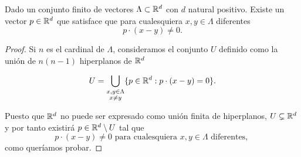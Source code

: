 \begin{lema}\label{lema:previo_propio_2_al_teorema_2_5}
    Dado un conjunto finito de vectores $\Lambda \subset \mathbb{R}^d$ con 
    $d$ natural positivo. 
    Existe un vector $p \in \mathbb{R}^d$ que satisface que 
    para cualesquiera $x,y \in \Lambda$ diferentes 
    \begin{equation}
        p \cdot(x-y) \neq 0.
    \end{equation}
\end{lema}
\begin{proof}
    Si $n$ es el cardinal de $\Lambda$,
    consideramos el conjunto $U$ definido como la unión de 
    $n (n-1)$ hiperplanos de $\mathbb{R}^d$

    \begin{equation}
        U = \bigcup_{ 
            \substack{
                x,y \in \Lambda \\
                x \neq y
            }
        }
        \{ 
            p \in \mathbb{R}^d: p \cdot (x-y) = 0
        \}.
    \end{equation}

    Puesto que $\mathbb{R}^d$ no puede ser expresado como unión finita de hiperplanos,
    $U \subsetneq \mathbb{R}^d$ y por tanto existirá $p \in \mathbb{R}^d \setminus U$ tal que 
    \begin{equation}
        p \cdot(x-y) \neq 0 
        \text{ para cualesquiera }
         x,y \in \Lambda \text{ diferentes, }
    \end{equation}
    como queríamos probar. 
\end{proof}

